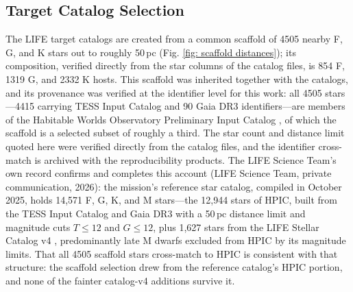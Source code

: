 \documentclass[12pt,a4paper]{article}
\numberwithin{equation}{section}
\numberwithin{figure}{section}
\numberwithin{table}{section}
\begin{document}
\subsection{Target Catalog Selection} \label{sec: intro: catalog}
The LIFE target catalogs are created from a common scaffold of 4505 nearby F, G, and K stars out to roughly 50\,pc (Fig. \ref{fig: scaffold distances}); its composition, verified directly from the star columns of the catalog files, is 854 F, 1319 G, and 2332 K hosts. This scaffold was inherited together with the catalogs, and its provenance was verified at the identifier level for this work: all 4505 stars---4415 carrying TESS Input Catalog and 90 Gaia DR3 identifiers---are members of the Habitable Worlds Observatory Preliminary Input Catalog \cite{tuchow2024hpic}, of which the scaffold is a selected subset of roughly a third. The star count and distance limit quoted here were verified directly from the catalog files, and the identifier cross-match is archived with the reproducibility products. The LIFE Science Team's own record confirms and completes this account (LIFE Science Team, private communication, 2026): the mission's reference star catalog, compiled in October 2025, holds 14,571 F, G, K, and M stars---the 12,944 stars of HPIC, built from the TESS Input Catalog and Gaia DR3 with a 50\,pc distance limit and magnitude cuts $T\leq12$ and $G\leq12$, plus 1,627 stars from the LIFE Stellar Catalog v4 \cite{menti2024life}, predominantly late M dwarfs excluded from HPIC by its magnitude limits. That all 4505 scaffold stars cross-match to HPIC is consistent with that structure: the scaffold selection drew from the reference catalog's HPIC portion, and none of the fainter catalog-v4 additions survive it.
\end{document}
